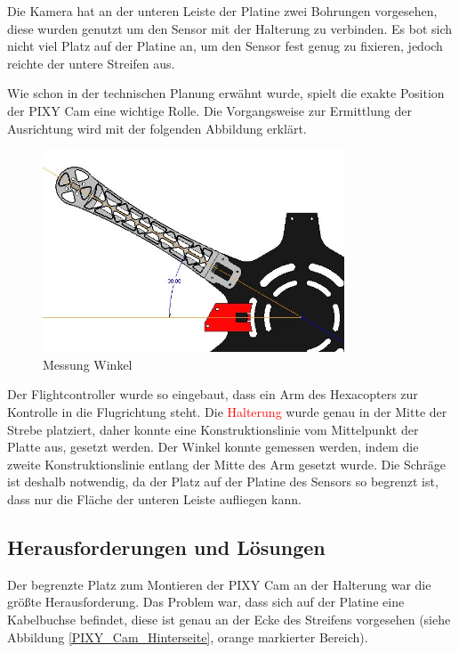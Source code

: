 	Die Kamera hat an der unteren Leiste der Platine zwei Bohrungen vorgesehen, diese wurden genutzt um den Sensor mit der Halterung zu verbinden.
	Es bot sich nicht viel Platz auf der Platine an, um den Sensor fest genug zu fixieren, jedoch reichte der untere Streifen aus.

	Wie schon in der technischen Planung erwähnt wurde, spielt die exakte Position der PIXY Cam eine wichtige Rolle.
	Die Vorgangsweise zur Ermittlung der Ausrichtung wird mit der folgenden Abbildung erklärt.

			\begin{figure}[tbh]
			\begin{centering}
			\includegraphics[width = 0.8\textwidth]{Bilder/winkel_pixy}
			\par\end{centering}
			\caption{Messung Winkel}
			\label{winkel_pixy}
			\end{figure}

	Der Flightcontroller wurde so eingebaut, dass ein Arm des Hexacopters zur Kontrolle in die Flugrichtung steht.
	Die \textcolor{red}{Halterung} wurde genau in der Mitte der Strebe platziert, daher konnte eine Konstruktionslinie vom Mittelpunkt der Platte aus, gesetzt werden.
	Der Winkel konnte gemessen werden, indem die zweite Konstruktionslinie entlang der Mitte des Arm gesetzt wurde.
	Die Schräge ist deshalb notwendig, da der Platz auf der Platine des Sensors so begrenzt ist, dass nur die Fläche der unteren Leiste aufliegen kann.

			\newpage

	\subsection{Herausforderungen und Lösungen}

	Der begrenzte Platz zum Montieren der PIXY Cam an der Halterung war die größte Herausforderung.
	Das  Problem war, dass sich auf der Platine eine Kabelbuchse befindet, diese ist genau an der Ecke des Streifens vorgesehen (siehe Abbildung \ref{PIXY_Cam_Hinterseite}, orange markierter Bereich).

